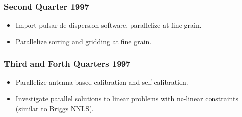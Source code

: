 \subsubsection{Second Quarter 1997}

\begin{itemize}

\item Import pulsar de-dispersion software, parallelize at fine
grain.

\item Parallelize sorting and gridding at fine grain.

\end{itemize}

\subsubsection{Third and Forth Quarters 1997}

\begin{itemize}

\item Parallelize antenna-based calibration and self-calibration.

\item Investigate parallel solutions to linear problems with
no-linear constraints (similar to Briggs NNLS).

\end{itemize}

%
